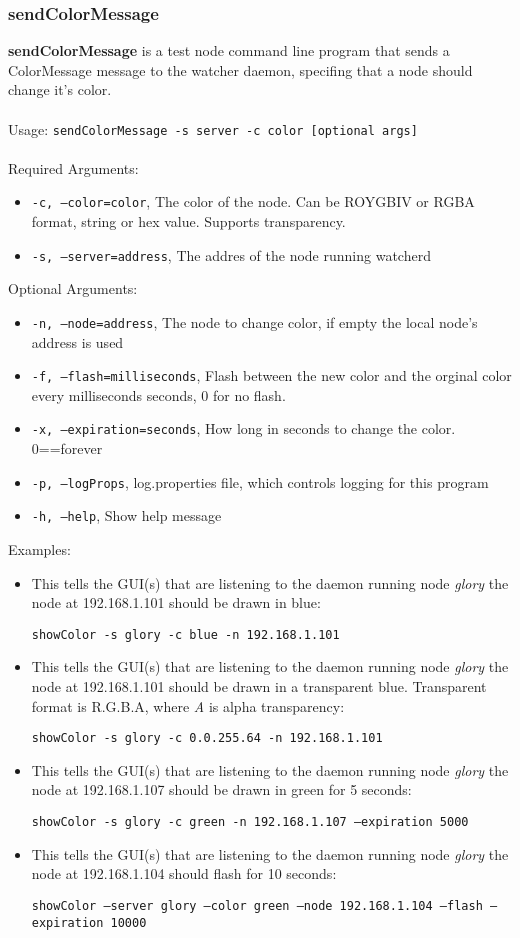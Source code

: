 \newpage
\label{sendColorMessage}
\subsubsection{sendColorMessage}
{\bf sendColorMessage} is a test node command line program that sends a ColorMessage message to the watcher daemon, specifing that a node should change it's color. 
\\\\
Usage: 
{\tt sendColorMessage -s server -c color [optional args]}
\\\\
Required Arguments:
\begin{itemize}
\item {\tt -c, --color=color}, The color of the node. Can be ROYGBIV or RGBA format, string or hex value. Supports transparency. 
\item {\tt -s, --server=address}, The addres of the node running watcherd
\end{itemize}
Optional Arguments:
\begin{itemize}
\item {\tt -n, --node=address}, The node to change color, if empty the local node's address is used
\item {\tt -f, --flash=milliseconds}, Flash between the new color and the orginal color every milliseconds seconds, 0 for no flash.
\item {\tt -x, --expiration=seconds}, How long in seconds to change the color. 0==forever
\item {\tt -p, --logProps}, log.properties file, which controls logging for this program
\item {\tt -h, --help}, Show help message
\end{itemize}
Examples:
\begin{itemize}
\item This tells the GUI(s) that are listening to the daemon running node {\em glory} the node at 192.168.1.101 should be drawn in blue:

{\tt showColor -s glory -c blue -n 192.168.1.101}

\item This tells the GUI(s) that are listening to the daemon running node {\em glory} the node at 192.168.1.101 should be drawn in a transparent blue. 
Transparent format is R.G.B.A, where {\em A} is alpha transparency:

{\tt showColor -s glory -c 0.0.255.64 -n 192.168.1.101}
  
\item This tells the GUI(s) that are listening to the daemon running node {\em glory} the node at 192.168.1.107 should be drawn in green for 5 seconds:
 
{\tt showColor -s glory -c green -n 192.168.1.107 --expiration 5000}
 
\item This tells the GUI(s) that are listening to the daemon running node {\em glory} the node at 192.168.1.104 should flash for 10 seconds:
 
{\tt showColor --server glory --color green --node 192.168.1.104 --flash --expiration 10000}

\end{itemize}
